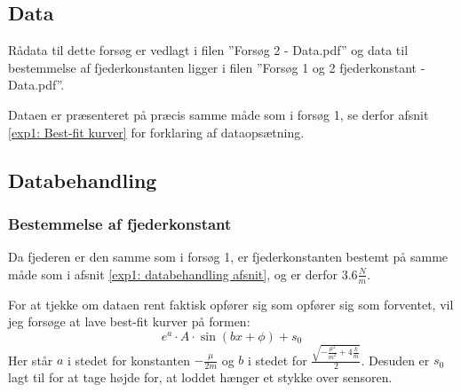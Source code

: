 \subsection{Data}
Rådata til dette forsøg er vedlagt i filen ''Forsøg 2 - Data.pdf'' og data til bestemmelse af fjederkonstanten ligger i filen ''Forsøg 1 og 2 fjederkonstant - Data.pdf''. 

Dataen er præsenteret på præcis samme måde som i forsøg 1, se derfor afsnit \ref{exp1: Best-fit kurver} for forklaring af dataopsætning.



\subsection{Databehandling}
\subsubsection{Bestemmelse af fjederkonstant}
Da fjederen er den samme som i forsøg 1, er fjederkonstanten bestemt på samme måde som i afsnit \ref{exp1: databehandling afsnit}, og er derfor $3.6\frac{N}{m}$.

For at tjekke om dataen rent faktisk opfører sig som opfører sig som forventet, vil jeg forsøge at lave best-fit kurver på formen:
$$e^a \cdot A \cdot \sin (bx+\phi)+s_0$$
Her står $a$ i stedet for konstanten $-\frac{\mu}{2m}$ og $b$ i stedet for 
$\frac{\sqrt{-\frac{\mu^2}{m^2}+4\frac{k}{m}}}{2}$.
Desuden er $s_0$ lagt til for at tage højde for, at loddet hænger et stykke over sensoren.

